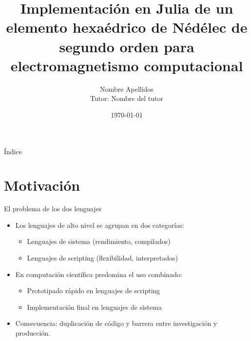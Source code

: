 \documentclass[aspectratio=169,11pt]{beamer}
\title[Elemento de Nédélec en Julia]{Implementación en Julia de un elemento hexaédrico de Nédélec de segundo orden para electromagnetismo computacional}
\author[Nombre Apellidos]{Nombre Apellidos\\[2mm]\footnotesize Tutor: Nombre del tutor}
\institute[UC3M]{Universidad Carlos III de Madrid\\Grupo GREMA}
\date{\today}
\begin{document}

\begin{frame}
  \titlepage
\end{frame}

\begin{frame}{Índice}
  \tableofcontents
\end{frame}

\section{Motivación}

\begin{frame}{El problema de los dos lenguajes}
  \begin{itemize}
    \item Los lenguajes de alto nivel se agrupan en dos categorías:
      \begin{itemize}
        \item Lenguajes de sistema (rendimiento, compilados)
        \item Lenguajes de scripting (flexibilidad, interpretados)
      \end{itemize}
    \item En computación científica predomina el uso combinado:
      \begin{itemize}
        \item Prototipado rápido en lenguajes de scripting
        \item Implementación final en lenguajes de sistema
      \end{itemize}
    \item \alert{Consecuencia}: duplicación de código y barrera entre
          investigación y producción.
  \end{itemize}
\end{frame}
\end{document}
